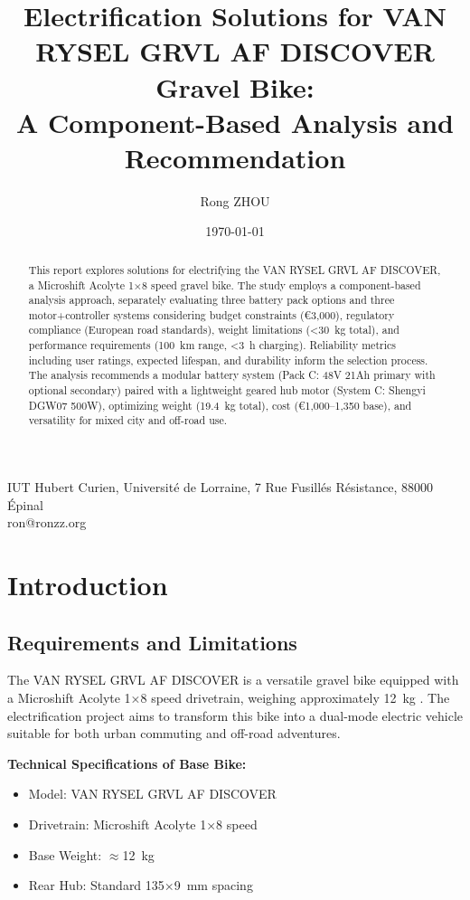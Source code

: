 \documentclass[12pt,a4paper]{article}
\title{Electrification Solutions for VAN RYSEL GRVL AF DISCOVER Gravel Bike:\\
A Component-Based Analysis and Recommendation}
\author{Rong ZHOU}
\date{\today}
\makeatletter
\newcommand{\univaddress}{IUT Hubert Curien, Université de Lorraine, 7 Rue Fusillés Résistance, 88000 Épinal}
\newcommand{\contact}{ron@ronzz.org}
\makeatother
\begin{document}
\maketitle
\begin{center}
\univaddress\\
\contact
\end{center}

\begin{abstract}
This report explores solutions for electrifying the VAN RYSEL GRVL AF DISCOVER, a Microshift Acolyte 1×8 speed gravel bike. The study employs a component-based analysis approach, separately evaluating three battery pack options and three motor+controller systems considering budget constraints (€3,000), regulatory compliance (European road standards), weight limitations (<30~kg total), and performance requirements (100~km range, <3~h charging). Reliability metrics including user ratings, expected lifespan, and durability inform the selection process. The analysis recommends a modular battery system (Pack C: 48V 21Ah primary with optional secondary) paired with a lightweight geared hub motor (System C: Shengyi DGW07 500W), optimizing weight (19.4~kg total), cost (€1,000--1,350 base), and versatility for mixed city and off-road use.
\end{abstract}

\section{Introduction}

\subsection{Requirements and Limitations}

The VAN RYSEL GRVL AF DISCOVER is a versatile gravel bike equipped with a Microshift Acolyte 1×8 speed drivetrain, weighing approximately 12~kg \cite{decathlon-bike}. The electrification project aims to transform this bike into a dual-mode electric vehicle suitable for both urban commuting and off-road adventures.

\textbf{Technical Specifications of Base Bike:}
\begin{itemize}
    \item Model: VAN RYSEL GRVL AF DISCOVER
    \item Drivetrain: Microshift Acolyte 1×8 speed
    \item Base Weight: $\approx$12~kg
    \item Rear Hub: Standard 135×9~mm spacing
\end{itemize}
\end{document}

